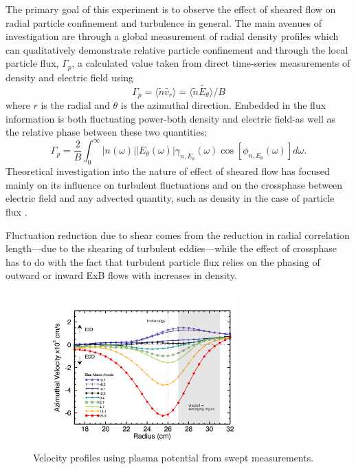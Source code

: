 \documentclass[%
 aip,
 amsmath,amssymb,
 preprint,%
]{revtex4-1}
\begin{document}

The primary goal of this experiment is to observe the effect of sheared flow on radial particle confinement and turbulence in general. The main avenues of investigation are through a global measurement of radial density profiles which can qualitatively demonstrate relative particle confinement and through the local particle flux, $\Gamma_{p}$, a calculated value taken from direct time-series measurements of density and electric field using 
\begin{equation}
\Gamma_{p} = \langle \tilde{n} \tilde{v_{r}} \rangle = \langle \tilde{n} \tilde{E_{\theta}} \rangle /B
\label{eq:flux}
\end{equation}
where $r$ is the radial and $\theta$ is the azimuthal direction. Embedded in the flux information is both fluctuating power-both density and electric field-as well as the relative phase between these two quantities: 
\begin{equation}
\Gamma_{p} = \frac{2}{B} \int^{\infty}_{0} \lvert n(\omega) \rvert \lvert E_{\theta}(\omega) \rvert \gamma_{n,E_{\theta}}(\omega) \cos [\phi_{n,E_{\theta}}(\omega)] d\omega.
\label{eq:fluxint}
\end{equation}
Theoretical investigation into the nature of effect of sheared flow has focused mainly on its influence on turbulent fluctuations \cite{biglari90} and on the crossphase between electric field and any advected quantity, such as density in the case of particle flux \cite{ware96,terry01}.  

Fluctuation reduction due to shear comes from the reduction in radial correlation length---due to the shearing of turbulent eddies---while the effect of crossphase has to do with the fact that turbulent particle flux relies on the phasing of outward or inward ExB flows with increases in density.

\begin{figure}
\begin{center}
\includegraphics[width=8cm]{velocity.png}%
\end{center}
\caption{\label{fig:velocity} Velocity profiles using plasma potential from swept measurements.}
\end{figure}
\end{document}
